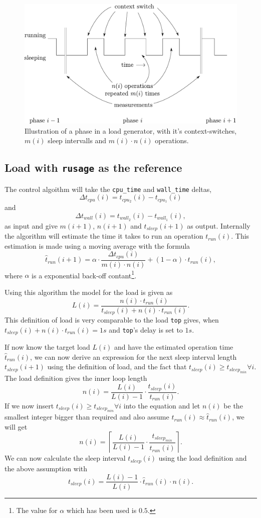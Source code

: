 \documentclass{article}
\begin{document}
\begin{figure}
  \centerline{\includegraphics[scale=0.4]{run_sleep.pdf}}
  \caption{Illustration of a phase in a load generator, with it's
    context-switches, $m(i)$ sleep intervalls and $m(i)\cdot n(i)$
    operations.}
  \label{fig:run_sleep}
\end{figure}

\subsection{Load with \texttt{rusage} as the reference}

The control algoithm will take the \texttt{cpu\_time} and
\texttt{wall\_time} deltas, $$\Delta
t_{cpu}(i)=t_{cpu_2}(i)-t_{cpu_1}(i)$$ and $$\Delta
t_{wall}(i)=t_{wall_2}(i)-t_{wall_1}(i),$$ as input and give $m(i+1)$,
$n(i+1)$ and $t_{sleep}(i+1)$ as output. Internally the algorithm will
estimate the time it takes to run an operation $t_{run}(i)$. This
estimation is made using a moving average with the formula
$$\hat{t}_{run}(i+1)=\alpha\cdot\frac{\Delta t_{cpu}(i)}{m(i)\cdot n(i)}+
(1-\alpha)\cdot t_{run}(i),$$ where $\alpha$ is a exponential back-off
contant\footnote{The value for $\alpha$ which has been used is $0.5$.}.

Using this algorithm the model for the load is given
as $$L(i)=\frac{n(i)\cdot t_{run}(i)}{t_{sleep}(i) + n(i)\cdot
  t_{run}(i)}.$$ This definition of load is very comparable to the
load \texttt{top} gives, when $t_{sleep}(i)+n(i)\cdot t_{run}(i)=1s$
and \texttt{top}'s delay is set to $1s$.

If now know the target load $L(i)$ and have the estimated operation
time $\hat{t}_{run}(i)$, we can now derive an expression for the next
sleep interval length $t_{sleep}(i+1)$ using the definition of load,
and the fact that $t_{sleep}(i) \geq t_{sleep_{min}} \forall i$. The
load definition gives the inner loop length $$n(i) =
\frac{L(i)}{L(i)-1}\cdot\frac{t_{sleep}(i)}{t_{run}(i)}.$$ If we now
insert $t_{sleep}(i) \geq t_{sleep_{min}} \forall i$ into the equation
and let $n(i)$ be the smallest integer bigger than required and also
assume $t_{run}(i)\approx\hat{t}_{run}(i)$, we will get $$
n(i)=\left\lceil
\frac{L(i)}{L(i)-1}\cdot\frac{t_{sleep_{min}}}{\hat{t}_{run}(i)}
\right\rceil.$$ We can now calculate the sleep interval $t_{sleep}(i)$
using the load definition and the above assumption with
 $$t_{sleep}(i)=\frac{L(i)-1}{L(i)}\cdot \hat{t}_{run}(i)\cdot n(i).$$
\end{document}
